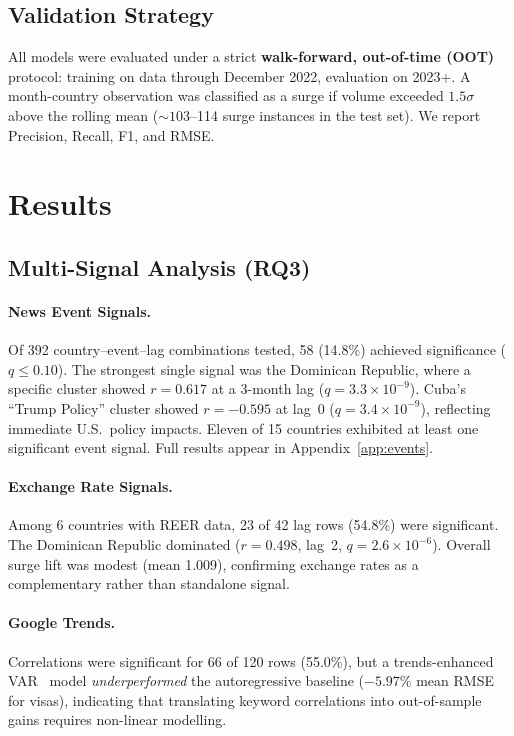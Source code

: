 \documentclass[11pt, a4paper]{article}
\begin{document}
\subsection{Validation Strategy}

All models were evaluated under a strict \textbf{walk-forward, out-of-time (OOT)}
protocol: training on data through December 2022, evaluation on 2023+.  A month-country
observation was classified as a surge if volume exceeded $1.5\sigma$ above the rolling
mean (${\sim}103$--114 surge instances in the test set).  We report Precision, Recall,
F1, and RMSE.


\section{Results}

\subsection{Multi-Signal Analysis (RQ3)}

\paragraph{News Event Signals.}
Of 392 country--event--lag combinations tested, 58 (14.8\%) achieved significance
($q \leq 0.10$).  The strongest single signal was the Dominican Republic, where a
specific cluster showed $r = 0.617$ at a 3-month lag
($q = 3.3 \times 10^{-9}$).  Cuba's ``Trump Policy'' cluster showed $r = -0.595$ at
lag~0 ($q = 3.4 \times 10^{-9}$), reflecting immediate U.S.\ policy impacts.  Eleven
of 15 countries exhibited at least one significant event signal.  Full results appear in
Appendix~\ref{app:events}.

\paragraph{Exchange Rate Signals.}
Among 6 countries with REER data, 23 of 42 lag rows (54.8\%) were significant.  The
Dominican Republic dominated ($r = 0.498$, lag~2, $q = 2.6 \times 10^{-6}$).  Overall
surge lift was modest (mean 1.009), confirming exchange rates as a complementary rather
than standalone signal.

\paragraph{Google Trends.}
Correlations were significant for 66 of 120 rows (55.0\%), but a trends-enhanced
VAR~\citep{hamilton1994,sims1980} model \textit{underperformed} the autoregressive
baseline ($-5.97\%$ mean RMSE for visas), indicating that translating keyword
correlations into out-of-sample gains requires non-linear modelling.
\end{document}
